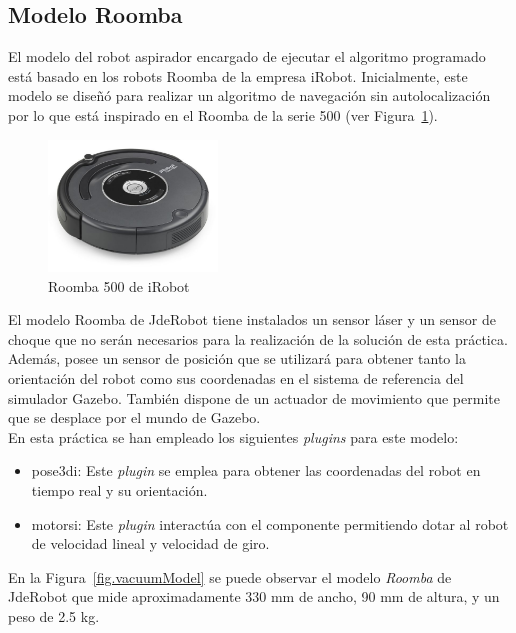 \subsection{Modelo Roomba}
El modelo del robot aspirador encargado de ejecutar el algoritmo programado está basado en los robots Roomba de la empresa iRobot. Inicialmente, este modelo se diseñó para realizar un algoritmo de navegación sin autolocalización por lo que está inspirado en el Roomba de la serie 500 (ver Figura~\ref{fig.roomba500}). 

\begin{figure}[H]
  \begin{center}
    \includegraphics[width=0.4\textwidth]{figures/Vacuum/roomba500.jpg}
		\caption{Roomba 500 de iRobot}
		\label{fig.roomba500}
		\end{center}
\end{figure}

El modelo Roomba de JdeRobot tiene instalados un sensor láser y un sensor de choque que no serán necesarios para la realización de la solución de esta práctica. Además, posee un sensor de posición que se utilizará para obtener tanto la orientación del robot como sus coordenadas en el sistema de referencia del simulador Gazebo. También dispone de un actuador de movimiento que permite que se desplace por el mundo de Gazebo. \\

En esta práctica se han empleado los siguientes \textit{plugins} para este modelo:

\begin{itemize}
\item pose3di: Este \textit{plugin} se emplea para obtener las coordenadas del robot en tiempo real y su orientación.
\item motorsi: Este \textit{plugin} interactúa con el componente permitiendo dotar al robot de velocidad lineal y velocidad de giro.
\end{itemize}

En la Figura~\ref{fig.vacuumModel} se puede observar el modelo \textit{Roomba} de JdeRobot que mide aproximadamente 330 mm de ancho, 90 mm de altura, y un peso de 2.5 kg.\\

